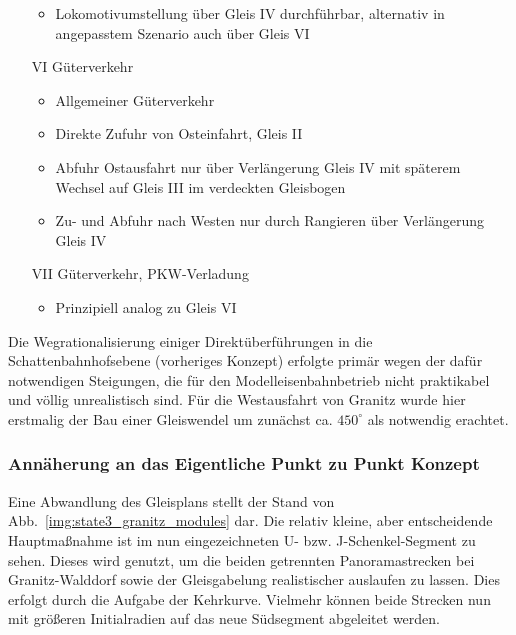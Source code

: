 \begin{itemize}
\begin{itemize}
		\item Lokomotivumstellung \"uber Gleis IV durchf\"uhrbar, alternativ in angepasstem Szenario auch \"uber Gleis VI
	\end{itemize}
	\item[VI] G\"uterverkehr
	\begin{itemize}
		\item Allgemeiner G\"uterverkehr
		\item Direkte Zufuhr von Osteinfahrt, Gleis II
		\item Abfuhr Ostausfahrt nur \"uber Verl\"angerung Gleis IV mit sp\"aterem Wechsel auf Gleis III im verdeckten Gleisbogen
		\item Zu- und Abfuhr nach Westen nur durch Rangieren \"uber Verl\"angerung Gleis IV
	\end{itemize}
	\item[VII] G\"uterverkehr, PKW-Verladung
	\begin{itemize}
		\item Prinzipiell analog zu Gleis VI
	\end{itemize}
\end{itemize}
	
Die Wegrationalisierung einiger Direkt\"uberf\"uhrungen in die Schattenbahnhofsebene (vorheriges Konzept) erfolgte prim\"ar wegen der daf\"ur notwendigen Steigungen, die f\"ur den Modelleisenbahnbetrieb nicht praktikabel und v\"ollig unrealistisch sind.
F\"ur die Westausfahrt von Granitz wurde hier erstmalig der Bau einer Gleiswendel um zun\"achst ca. $450^{\circ}$ als notwendig erachtet.



\subsubsection{Ann\"aherung an das Eigentliche Punkt zu Punkt Konzept}
\label{sec:map_development_state3}

Eine Abwandlung des Gleisplans stellt der Stand von Abb.~\ref{img:state3_granitz_modules} dar.
Die relativ kleine, aber entscheidende Hauptma{\ss}nahme ist im nun eingezeichneten U- bzw. J-Schenkel-Segment zu sehen.
Dieses wird genutzt, um die beiden getrennten Panoramastrecken bei Granitz-Walddorf sowie der Gleisgabelung realistischer auslaufen zu lassen.
Dies erfolgt durch die Aufgabe der Kehrkurve.
Vielmehr k\"onnen beide Strecken nun mit gr\"o{\ss}eren Initialradien auf das neue S\"udsegment abgeleitet werden.

